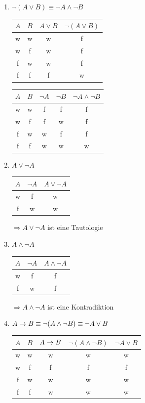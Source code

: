 \Bsps
\begin{enumerate}
	\item $\neg(A\lor B) \equiv \neg A \land \neg B$
	
	\begin{tabular}{c|c|c|c}
		$A$ & $B$ & $A\lor B$ & $\neg(A\lor B)$ \\ 
		\hline 
		w & w & w & f \\ 
		w & f & w & f \\ 
		f & w & w & f \\ 
		f & f & f & w 
	\end{tabular} 
	
	\begin{tabular}{c|c|c|c|c}
		$A$ & $B$ & $\neg A$ & $\neg B$ & $\neg A \land \neg B$ \\ 
		\hline 
		w & w & f & f & f \\ 
		w & f & f & w & f \\ 
		f & w & w & f & f \\ 
		f & f & w & w & w 
	\end{tabular} 
	
	\item $A \lor \neg A$
	
	\begin{tabular}{c|c|c}
		$A$ & $\neg A$ & $A \lor \neg A$ \\ 
		\hline 
		w & f & w \\ 
		f & w & w
	\end{tabular}
	
	$\Rightarrow A \lor \neg A$  ist eine Tautologie
	
	\item $A \land \neg A$
	
	\begin{tabular}{c|c|c}
		$A$ & $\neg A$ & $A \land \neg A$ \\ 
		\hline 
		w & f & f \\ 
		f & w & f
	\end{tabular}
	
	$\Rightarrow A \land \neg A$  ist eine Kontradiktion
	
	\item $A\rightarrow B \equiv \neg(A\land \neg B) \equiv \neg A \lor B$
	
	\begin{tabular}{c|c|c|c|c}
		$A$ & $B$ & $A\rightarrow B$ & $\neg(A\land \neg B)$ & $\neg A \lor B$ \\ 
		\hline 
		w & w & w & w & w \\ 
		w & f & f & f & f \\ 
		f & w & w & w & w \\ 
		f & f & w & w & w \\
	\end{tabular} 
\end{enumerate}

